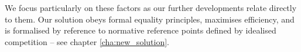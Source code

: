 We focus particularly on these factors as our further developments relate directly to them.
Our solution obeys formal equality principles, maximises efficiency, and is formalised by reference to normative reference points defined by idealised competition -- see chapter \ref{cha:new_solution}.




